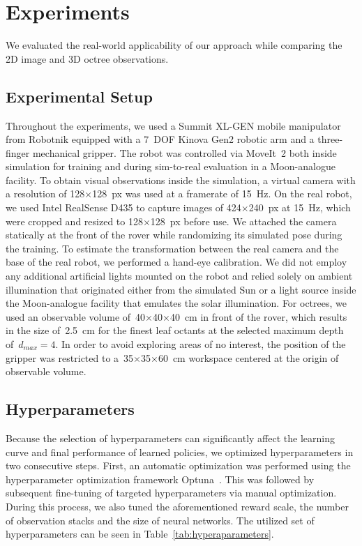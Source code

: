 \section{Experiments}\label{sec:experiments}

We evaluated the real-world applicability of our approach while comparing the 2D image and 3D octree observations.

\subsection{Experimental Setup}\label{ssec:experimental-setup}

Throughout the experiments, we used a Summit XL-GEN mobile manipulator from Robotnik equipped with a 7~DOF Kinova Gen2 robotic arm and a three-finger mechanical gripper. The robot was controlled via MoveIt~2 both inside simulation for training and during sim-to-real evaluation in a Moon-analogue facility. To obtain visual observations inside the simulation, a virtual camera with a resolution of 128\(\times\)128~px was used at a framerate of 15~Hz. On the real robot, we used Intel RealSense D435 to capture images of 424\(\times\)240~px at 15~Hz, which were cropped and resized to 128\(\times\)128~px before use. We attached the camera statically at the front of the rover while randomizing its simulated pose during the training. To estimate the transformation between the real camera and the base of the real robot, we performed a hand-eye calibration. We did not employ any additional artificial lights mounted on the robot and relied solely on ambient illumination that originated either from the simulated Sun or a light source inside the Moon-analogue facility that emulates the solar illumination. For octrees, we used an observable volume of~40\(\times\)40\(\times\)40~cm in front of the rover, which results in the size of~2.5~cm for the finest leaf octants at the selected maximum depth of~\(d_{max}=4\). In order to avoid exploring areas of no interest, the position of the gripper was restricted to a~35\(\times\)35\(\times\)60~cm workspace centered at the origin of observable volume.

\subsection{Hyperparameters}\label{ssec:hyperparameters}

Because the selection of hyperparameters can significantly affect the learning curve and final performance of learned policies, we optimized hyperparameters in two consecutive steps. First, an automatic optimization was performed using the hyperparameter optimization framework Optuna~\cite{akiba_optuna_2019}. This was followed by subsequent fine-tuning of targeted hyperparameters via manual optimization. During this process, we also tuned the aforementioned reward scale, the number of observation stacks and the size of neural networks. The utilized set of hyperparameters can be seen in Table~\ref{tab:hyperaparameters}.

